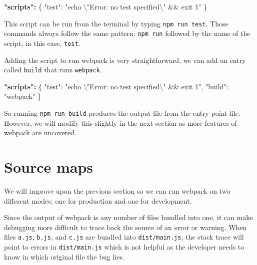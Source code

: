 \documentclass[
  10pt,
]{krantz}
\makeatletter
\newenvironment{Shaded}{\begin{snugshade}}{\end{snugshade}}
\newcommand{\CharTok}[1]{\textcolor[rgb]{0.5,0.5,0.5}{#1}}
\newcommand{\DataTypeTok}[1]{\textcolor[rgb]{0.27,0.27,0.27}{#1}}
\newcommand{\ErrorTok}[1]{\textcolor[rgb]{0.14,0.14,0.14}{\textbf{#1}}}
\newcommand{\FunctionTok}[1]{\textcolor[rgb]{0,0,0}{#1}}
\newcommand{\StringTok}[1]{\textcolor[rgb]{0.5,0.5,0.5}{#1}}
\newenvironment{kframe}{%
\medskip{}
\setlength{\fboxsep}{.8em}
 \def\at@end@of@kframe{}%
 \ifinner\ifhmode%
  \def\at@end@of@kframe{\end{minipage}}%
  \begin{minipage}{\columnwidth}%
 \fi\fi%
 \def\FrameCommand##1{\hskip\@totalleftmargin \hskip-\fboxsep
 \colorbox{shadecolor}{##1}\hskip-\fboxsep
     \hskip-\linewidth \hskip-\@totalleftmargin \hskip\columnwidth}%
 \MakeFramed {\advance\hsize-\width
   \@totalleftmargin\z@ \linewidth\hsize
   \@setminipage}}%
 {\par\unskip\endMakeFramed%
 \at@end@of@kframe}
\renewenvironment{Shaded}{\begin{kframe}}{\end{kframe}}
\makeatother
\begin{document}
\begin{Shaded}
\begin{Highlighting}[]
\ErrorTok{"scripts":} \FunctionTok{\{}
  \DataTypeTok{"test"}\FunctionTok{:} \StringTok{"echo }\CharTok{\textbackslash{}"}\StringTok{Error: no test specified}\CharTok{\textbackslash{}"}\StringTok{ \&\& exit 1"}
\FunctionTok{\}}
\end{Highlighting}
\end{Shaded}

This script can be run from the terminal by typing \texttt{npm\ run\ test}. Those commands always follow the same pattern: \texttt{npm\ run} followed by the name of the script, in this case, \texttt{test}.

Adding the script to run webpack is very straightforward, we can add an entry called \texttt{build} that runs \texttt{webpack}.

\begin{Shaded}
\begin{Highlighting}[]
\ErrorTok{"scripts":} \FunctionTok{\{}
  \DataTypeTok{"test"}\FunctionTok{:} \StringTok{"echo }\CharTok{\textbackslash{}"}\StringTok{Error: no test specified}\CharTok{\textbackslash{}"}\StringTok{ \&\& exit 1"}\FunctionTok{,}
  \DataTypeTok{"build"}\FunctionTok{:} \StringTok{"webpack"}
\FunctionTok{\}}
\end{Highlighting}
\end{Shaded}

So running \texttt{npm\ run\ build} produces the output file from the entry point file. However, we will modify this slightly in the next section as more features of webpack are uncovered.

\hypertarget{webpack-intro-webpack-mode}{%
\section{Source maps}\label{webpack-intro-webpack-mode}}

We will improve upon the previous section so we can run webpack on two different modes; one for production and one for development.

Since the output of webpack is any number of files bundled into one, it can make debugging more difficult to trace back the source of an error or warning. When files \texttt{a.js}, \texttt{b.js}, and \texttt{c.js} are bundled into \texttt{dist/main.js}, the stack trace will point to errors in \texttt{dist/main.js} which is not helpful as the developer needs to know in which original file the bug lies.
\end{document}
